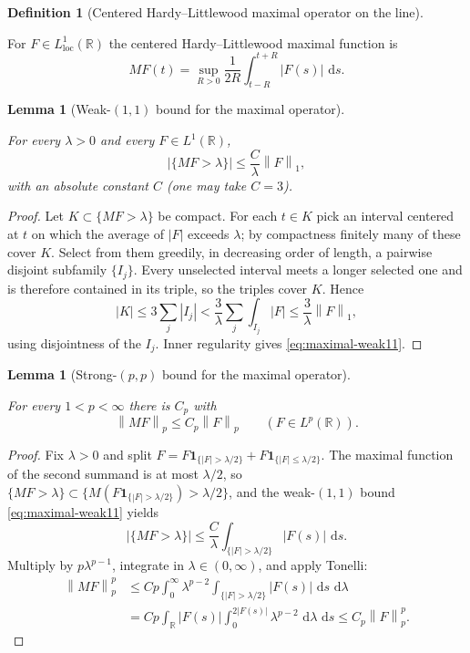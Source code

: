 \documentclass[11pt,oneside]{book}
\providecommand{\uses}[1]{}
\newtheorem{lemma}[theorem]{Lemma}
\theoremstyle{definition}
\newtheorem{definition}[theorem]{Definition}
\theoremstyle{remark}
\newcommand{\R}{\mathbb R}
\newcommand{\1}{\mathbf 1}
\newcommand{\loc}{\mathrm{loc}}
\newcommand{\dd}{\,\mathrm d}
\newcommand{\norm}[1]{\left\lVert #1\right\rVert}
\newcommand{\abs}[1]{\left\lvert #1\right\rvert}
\begin{document}
\begin{definition}[Centered Hardy--Littlewood maximal operator on the line]\label{def:maximal-function}
\uses{}
For $F\in L^1_{\loc}(\R)$ the centered Hardy--Littlewood maximal function is
\[
 MF(t)=\sup_{R>0}\frac1{2R}\int_{t-R}^{t+R}\abs{F(s)}\,\dd s.
\]
\end{definition}

\begin{lemma}[Weak-$(1,1)$ bound for the maximal operator]\label{lem:maximal-weak11}
\uses{def:maximal-function}
For every $\lambda>0$ and every $F\in L^1(\R)$,
\begin{equation}
 \big|\{MF>\lambda\}\big|\le\frac{C}{\lambda}\norm{F}_{1},
 \label{eq:maximal-weak11}
\end{equation}
with an absolute constant $C$ (one may take $C=3$).
\end{lemma}

\begin{proof}
\uses{def:maximal-function}
Let $K\subset\{MF>\lambda\}$ be compact. For each $t\in K$ pick an interval
centered at $t$ on which the average of $\abs{F}$ exceeds $\lambda$; by
compactness finitely many of these cover $K$. Select from them greedily, in
decreasing order of length, a pairwise disjoint subfamily $\{I_j\}$. Every
unselected interval meets a longer selected one and is therefore contained in
its triple, so the triples cover $K$. Hence
\[
 \abs{K}\le3\sum_j\abs{I_j}
 <\frac3\lambda\sum_j\int_{I_j}\abs{F}
 \le\frac3\lambda\norm{F}_1,
\]
using disjointness of the $I_j$. Inner regularity gives
\eqref{eq:maximal-weak11}.
\end{proof}

\begin{lemma}[Strong-$(p,p)$ bound for the maximal operator]\label{lem:maximal-strongp}
\uses{def:maximal-function}
For every $1<p<\infty$ there is $C_p$ with
\begin{equation}
 \norm{MF}_{p}\le C_p\norm{F}_{p}\qquad(F\in L^p(\R)).
 \label{eq:maximal-strongp}
\end{equation}
\end{lemma}

\begin{proof}
\uses{lem:maximal-weak11}
Fix $\lambda>0$ and split
$F=F\1_{\{\abs{F}>\lambda/2\}}+F\1_{\{\abs{F}\le\lambda/2\}}$. The maximal
function of the second summand is at most $\lambda/2$, so
$\{MF>\lambda\}\subset\{M(F\1_{\{\abs F>\lambda/2\}})>\lambda/2\}$, and the
weak-$(1,1)$ bound \eqref{eq:maximal-weak11} yields
\[
 \abs{\{MF>\lambda\}}
 \le\frac{C}{\lambda}\int_{\{\abs{F}>\lambda/2\}}\abs{F(s)}\,\dd s.
\]
Multiply by $p\lambda^{p-1}$, integrate in $\lambda\in(0,\infty)$, and apply
Tonelli:
\begin{align*}
 \norm{MF}_p^p
 &\le Cp\int_0^\infty\lambda^{p-2}
       \int_{\{\abs{F}>\lambda/2\}}\abs{F(s)}\,\dd s\,\dd\lambda\\
 &=Cp\int_\R\abs{F(s)}
      \int_0^{2\abs{F(s)}}\lambda^{p-2}\,\dd\lambda\,\dd s
 \le C_p\norm{F}_p^p.
\end{align*}
\end{proof}
\end{document}
